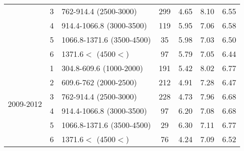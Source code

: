 \begin{table}[htbp]
\begin{tabular}{rrlcccc}
    \multicolumn{1}{c}{} & \multicolumn{1}{c}{3} & \multicolumn{1}{l}{762-914.4 (2500-3000)} & 299   & 4.65  & 8.10  & 6.55  \\
    \multicolumn{1}{c}{} & \multicolumn{1}{c}{4} & \multicolumn{1}{l}{914.4-1066.8 (3000-3500)} & 119   & 5.95  & 7.06  & 6.58  \\
    \multicolumn{1}{c}{} & \multicolumn{1}{c}{5} & \multicolumn{1}{l}{1066.8-1371.6 (3500-4500)} & 35    & 5.98  & 7.03  & 6.50  \\
    \multicolumn{1}{c}{} & \multicolumn{1}{c}{6} & \multicolumn{1}{l}{1371.6$<$ (4500$<$)} & 97    & 5.79  & 7.05  & 6.44  \\
\midrule
    \multicolumn{1}{c}{\multirow{6}[2]{*}{\begin{sideways}2009-2012\end{sideways}}} & \multicolumn{1}{c}{1} & \multicolumn{1}{l}{304.8-609.6 (1000-2000)} & 191   & 5.42  & 8.02  & 6.77  \\
    \multicolumn{1}{c}{} & \multicolumn{1}{c}{2} & \multicolumn{1}{l}{609.6-762 (2000-2500)} & 212   & 4.91  & 7.28  & 6.47  \\
    \multicolumn{1}{c}{} & \multicolumn{1}{c}{3} & \multicolumn{1}{l}{762-914.4 (2500-3000)} & 228   & 4.73  & 7.96  & 6.68  \\
    \multicolumn{1}{c}{} & \multicolumn{1}{c}{4} & \multicolumn{1}{l}{914.4-1066.8 (3000-3500)} & 97    & 6.20  & 7.08  & 6.68  \\
    \multicolumn{1}{c}{} & \multicolumn{1}{c}{5} & \multicolumn{1}{l}{1066.8-1371.6 (3500-4500)} & 29    & 6.30  & 7.11  & 6.77  \\
    \multicolumn{1}{c}{} & \multicolumn{1}{c}{6} & \multicolumn{1}{l}{1371.6$<$ (4500$<$)} & 76    & 4.24  & 7.09  & 6.52  \\
    \bottomrule
    \end{tabular}%
  \label{tab:DSpH}%
\end{table}%

